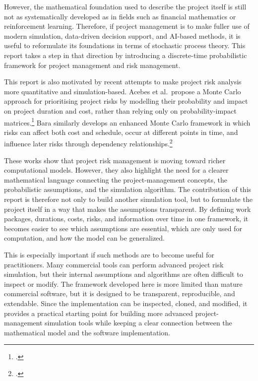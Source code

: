 \documentclass[11pt,a4paper]{article}
\newcommand{\1}{\mathbf{1}}
\theoremstyle{definition}
\theoremstyle{plain}
\theoremstyle{remark}
\numberwithin{equation}{section}
\begin{document}
However, the mathematical foundation used to describe the project itself is still not as systematically developed as in fields such as financial mathematics or reinforcement learning. Therefore, if project management is to make fuller use of modern simulation, data-driven decision support, and AI-based methods, it is useful to reformulate its foundations in terms of stochastic process theory. This report takes a step in that direction by introducing a discrete-time probabilistic framework for project management and risk management.
% 

This report is also motivated by recent attempts to make project risk analysis more quantitative and simulation-based. Acebes et al.\ propose a Monte Carlo approach for prioritising project risks by modelling their probability and impact on project duration and cost, rather than relying only on probability-impact matrices.\footcite{acebes2024beyondProbabilityImpactMatrices} Bara similarly develops an enhanced Monte Carlo framework in which risks can affect both cost and schedule, occur at different points in time, and influence later risks through dependency relationships.\footcite{bara2025enhanced}

These works show that project risk management is moving toward richer computational models. However, they also highlight the need for a clearer mathematical language connecting the project-management concepts, the probabilistic assumptions, and the simulation algorithm. The contribution of this report is therefore not only to build another simulation tool, but to formulate the project itself in a way that makes the assumptions transparent. By defining work packages, durations, costs, risks, and information over time in one framework, it becomes easier to see which assumptions are essential, which are only used for computation, and how the model can be generalized.

This is especially important if such methods are to become useful for practitioners. Many commercial tools can perform advanced project risk simulation, but their internal assumptions and algorithms are often difficult to inspect or modify. The framework developed here is more limited than mature commercial software, but it is designed to be transparent, reproducible, and extendable. Since the implementation can be inspected, cloned, and modified, it provides a practical starting point for building more advanced project-management simulation tools while keeping a clear connection between the mathematical model and the software implementation.
\end{document}
